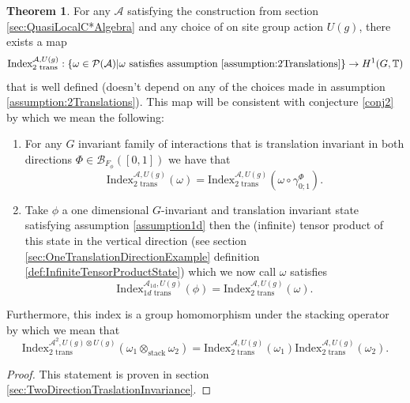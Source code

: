 \documentclass[12pt,a4paper,twoside]{article}
\newcommand{\BB}{\mathcal B}
\newcommand{\PP}{\mathcal P}
\newcommand{\TT}{\mathbb T}
\renewcommand{\AA}{\mathcal A}
\theoremstyle{definition}
\newtheorem{theorem}{Theorem}[section]
\numberwithin{equation}{section}
\begin{document}
\begin{theorem}\label{thrm:ExistenceSecondIndex}
	For any $\AA$ satisfying the construction from section \ref{sec:QuasiLocalC*Algebra} and any choice of on site group action $U(g)$, there exists a map
	\begin{equation}
		\textrm{Index}^{\AA,U(g)}_{2\text{ trans}}:\{\omega\in\PP(\AA)| \omega\text{ satisfies assumption \ref{assumption:2Translations}}\}\rightarrow H^1(G,\TT)
	\end{equation}
	that is well defined (doesn't depend on any of the choices made in assumption \ref{assumption:2Translations}). This map will be consistent with conjecture \ref{conj2} by which we mean the following:
	\begin{enumerate}
		\item For any $G$ invariant family of interactions that is translation invariant in both directions $\Phi\in\BB_{F_\phi}([0,1])$ we have that
		\begin{equation}
			\textrm{Index}^{\AA,U(g)}_{2\text{ trans}}(\omega)=\textrm{Index}^{\AA,U(g)}_{2\text{ trans}}(\omega\circ\gamma^\Phi_{0;1}).
		\end{equation}
		\item Take $\phi$ a one dimensional $G$-invariant and translation invariant state satisfying assumption \ref{assumption1d} then the (infinite) tensor product of this state in the vertical direction (see section \ref{sec:OneTranslationDirectionExample} definition \ref{def:InfiniteTensorProductState}) which we now call $\omega$ satisfies
		\begin{equation}
			\textrm{Index}^{\AA_{\text{1d}},U(g)}_{1d\text{ trans}}(\phi)=\text{Index}^{\AA,U(g)}_{2\text{ trans}}(\omega).
		\end{equation}
	\end{enumerate}
	Furthermore, this index is a group homomorphism under the stacking operator by which we mean that
	\begin{equation}
		\textrm{Index}_{\text{2 trans}}^{\AA^2,U(g)\otimes U(g)}(\omega_1\otimes_{\text{stack}}\omega_2)=\textrm{Index}_{\text{2 trans}}^{\AA,U(g)}(\omega_1)\textrm{Index}_{\text{2 trans}}^{\AA,U(g)}(\omega_2).
	\end{equation}
\end{theorem}
\begin{proof}
	This statement is proven in section \ref{sec:TwoDirectionTraslationInvariance}.
\end{proof}
\end{document}
